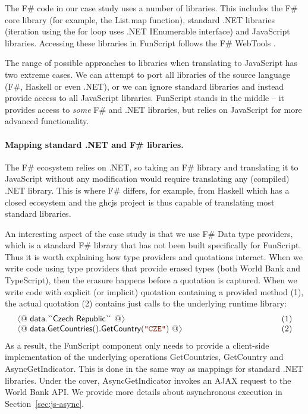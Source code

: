 \documentclass[submission,copyright,creativecommons]{eptcs}
\newcommand{\langl}{\begin{picture}(4.5,7)
\put(1.1,2.5){\rotatebox{60}{\line(1,0){5.5}}}
\put(1.1,2.5){\rotatebox{300}{\line(1,0){5.5}}}
\end{picture}}
\newcommand{\rangl}{\begin{picture}(4.5,7)
\put(.9,2.5){\rotatebox{120}{\line(1,0){5.5}}}
\put(.9,2.5){\rotatebox{240}{\line(1,0){5.5}}}
\end{picture}}
\newcommand{\kvd}[1]{\textnormal{\textcolor{kvdclr}{\sffamily #1}}}
\newcommand{\str}[1]{\textnormal{\textcolor{strclr}{\ttfamily "#1"}}}
\newcommand{\ident}[1]{\textnormal{\sffamily #1}}
\newcommand{\lident}[1]{\textnormal{\sffamily
  \`{}\hspace{-0.25em}\`{}\hspace{-0.1em}#1\`{}\hspace{-0.25em}\`{}}}
\begin{document}
The F\# code in our case study uses a number of libraries. This includes the F\# core library (for
example, the \ident{List.map} function), standard .NET libraries (iteration using the \kvd{for} loop
uses .NET \ident{IEnumerable} interface) and JavaScript libraries. Accessing these libraries in
FunScript follows the F\# WebTools \cite{fsharp-webtools}.

The range of possible approaches to libraries when translating to JavaScript has two extreme cases.
We can attempt to port all libraries of the source language (F\#, Haskell or even .NET), or we
can ignore standard libraries and instead provide access to all JavaScript libraries. FunScript
stands in the middle -- it provides access to \emph{some} F\# and .NET libraries,
but relies  on JavaScript for more advanced functionality.

\paragraph{Mapping standard .NET and F\# libraries.}
The F\# ecosystem relies on .NET, so taking an F\# library and translating it to JavaScript without
any modification would require translating any (compiled) .NET library. This is where F\# differs,
for example, from Haskell which has a closed ecosystem and the ghcjs project \cite{haskell-ghcjs}
is thus capable of translating most standard libraries.

An interesting aspect of the case study is that we use F\# Data \cite{fsharp-data} type providers,
which is a standard F\# library that has not been built specifically for FunScript. Thus it is worth
explaining how type providers and quotations interact.
When we write code using type providers that provide erased types (both World Bank and TypeScript),
then the erasure happens before a quotation is captured. When we write code with explicit (or
implicit) quotation containing a provided method (1), the actual
quotation (2) contains just calls to the underlying runtime library:
%
\begin{equation*}
\begin{array}{llr}
 \langl @~\ident{data.}\lident{Czech Republic}~@\rangl &\hspace{10em}& (1)\\
 \langl @~\ident{data.GetCountries}().\ident{GetCountry}(\str{CZE}) ~@\rangl  && (2)
\end{array}
\end{equation*}
%
As a result, the FunScript component only needs to provide a client-side implementation of the underlying
operations \ident{GetCountries}, \ident{GetCountry} and \ident{AsyncGetIndicator}. This is done in the
same way as mappings for standard .NET libraries. Under the cover, \ident{AsyncGetIndicator} invokes
an AJAX request to the World Bank API. We provide more details about asynchronous execution in
Section~\ref{sec:js-async}.
\end{document}
